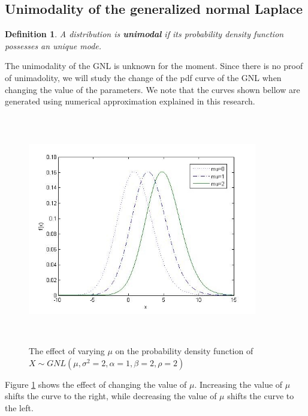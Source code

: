 \documentclass[12pt,travaildirige,nobabel, twoside]{dms}
\numberwithin{equation}{section}
\numberwithin{table}{chapter}
\numberwithin{figure}{chapter}
\newtheorem{mydef}{Definition}[section]
\begin{document}
\subsection{Unimodality of the generalized normal Laplace}\label{unimodal}

\begin{mydef}
A distribution is \textbf{unimodal} if its probability density function possesses an unique mode.
\end{mydef}

The unimodality of the GNL is unknown for the moment. Since there is no proof of unimadolity, we will study the change of the pdf curve of the GNL when changing the value of the parameters. We note that the curves shown bellow are generated using numerical approximation explained  in this research.\\ 

\clearpage

\begin{figure}[h!]
\caption {The effect of varying $\mu$ on the probability density function of $X\sim GNL(\mu,\sigma^2=2,\alpha=1,\beta=2,\rho=2)$}\label{fig:mu}
  \includegraphics[width=10cm,height=10cm,keepaspectratio]{mu.jpg}
\end{figure}

Figure \ref{fig:mu} shows the effect of changing the value of $\mu$. Increasing the value of $\mu$ shifts the curve to the right, while decreasing the value of $\mu$ shifts the curve to the left.
\end{document}

